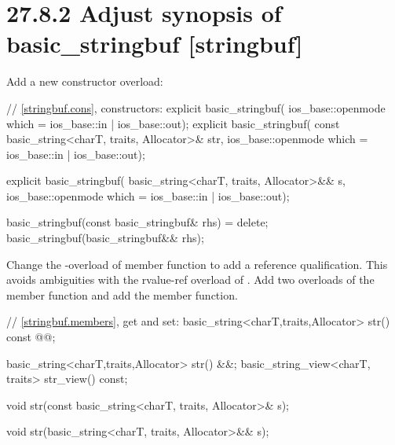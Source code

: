 \documentclass[ebook,11pt,article]{memoir}
\begin{document}
\section{27.8.2 Adjust synopsis of basic\_stringbuf [stringbuf]}
Add a new constructor overload:
\begin{codeblock}
    // \ref{stringbuf.cons}, constructors:
    explicit basic_stringbuf(
      ios_base::openmode which = ios_base::in | ios_base::out);
    explicit basic_stringbuf(
      const basic_string<charT, traits, Allocator>& str,
      ios_base::openmode which = ios_base::in | ios_base::out);
\end{codeblock}
\begin{addedblock}\begin{codeblock}
    explicit basic_stringbuf(
      basic_string<charT, traits, Allocator>&& s,
      ios_base::openmode which = ios_base::in | ios_base::out);
\end{codeblock}\end{addedblock}
\begin{codeblock}
    basic_stringbuf(const basic_stringbuf& rhs) = delete;
    basic_stringbuf(basic_stringbuf&& rhs);
\end{codeblock}

Change the -overload of  member function to add a reference qualification. This avoids ambiguities with the rvalue-ref overload of . Add two overloads of the  member function and add the  member function.

\begin{codeblock}
    // \ref{stringbuf.members}, get and set:
    basic_string<charT,traits,Allocator> str() const @\ins{\&}@;
\end{codeblock}
\begin{addedblock}\begin{codeblock}
    basic_string<charT,traits,Allocator> str() &&;
    basic_string_view<charT, traits> str_view() const;
\end{codeblock}\end{addedblock}
\begin{codeblock}
    void str(const basic_string<charT, traits, Allocator>& s);
\end{codeblock}
\begin{addedblock}
\begin{codeblock}
    void str(basic_string<charT, traits, Allocator>&& s);
\end{codeblock}
\end{addedblock}
\end{document}
